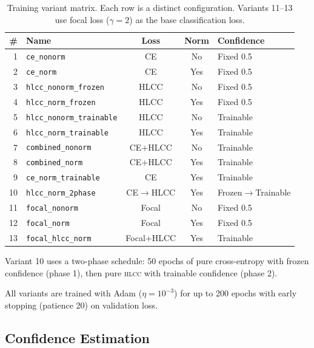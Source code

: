 \documentclass[11pt,a4paper]{article}
\newcommand{\hlcc}{\textsc{hlcc}}
\begin{document}
\begin{table}[H]
\centering
\caption{Training variant matrix.  Each row is a distinct configuration.
Variants 11--13 use focal loss ($\gamma=2$) as the base classification loss.}
\label{tab:variants}
\begin{tabular}{@{}rlccl@{}}
\toprule
\# & Name & Loss & Norm & Confidence \\
\midrule
1  & \texttt{ce\_nonorm}          & CE        & No  & Fixed 0.5 \\
2  & \texttt{ce\_norm}            & CE        & Yes & Fixed 0.5 \\
3  & \texttt{hlcc\_nonorm\_frozen}    & HLCC      & No  & Fixed 0.5 \\
4  & \texttt{hlcc\_norm\_frozen}      & HLCC      & Yes & Fixed 0.5 \\
5  & \texttt{hlcc\_nonorm\_trainable} & HLCC      & No  & Trainable \\
6  & \texttt{hlcc\_norm\_trainable}   & HLCC      & Yes & Trainable \\
7  & \texttt{combined\_nonorm}    & CE+HLCC   & No  & Trainable \\
8  & \texttt{combined\_norm}      & CE+HLCC   & Yes & Trainable \\
9  & \texttt{ce\_norm\_trainable}     & CE        & Yes & Trainable \\
10 & \texttt{hlcc\_norm\_2phase}      & CE$\to$HLCC & Yes & Frozen$\to$Trainable \\
\midrule
11 & \texttt{focal\_nonorm}      & Focal     & No  & Fixed 0.5 \\
12 & \texttt{focal\_norm}        & Focal     & Yes & Fixed 0.5 \\
13 & \texttt{focal\_hlcc\_norm}  & Focal+HLCC & Yes & Trainable \\
\bottomrule
\end{tabular}
\end{table}

Variant 10 uses a two-phase schedule: 50 epochs of pure
cross-entropy with frozen confidence (phase 1), then pure \hlcc{}
with trainable confidence (phase 2).

All variants are trained with Adam ($\eta = 10^{-3}$) for up to 200
epochs with early stopping (patience 20) on validation loss.

\subsection{Confidence Estimation}
\end{document}
